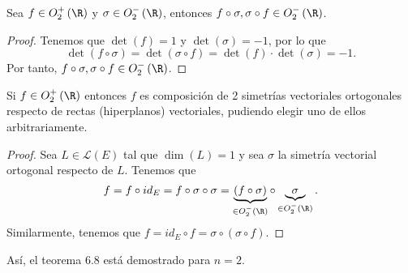\begin{flema}[]
\normalfont Sea $\displaystyle f \in O^{+}_{2}\left(\R\right) $ y $\displaystyle \sigma \in O^{-}_{2}\left(\R\right) $, entonces $\displaystyle f\circ \sigma, \sigma\circ f \in O^{-}_{2}\left(\R\right) $.
\end{flema}
\begin{proof}
Tenemos que $\displaystyle \det\left(f\right) = 1 $ y $\displaystyle \det\left(\sigma \right) = -1$, por lo que
\[ \det\left(f \circ \sigma \right) = \det\left(\sigma \circ f\right) = \det\left(f\right) \cdot \det\left(\sigma \right) = -1 .\]
Por tanto, $\displaystyle f \circ \sigma, \sigma \circ f \in O^{-}_{2}\left(\R\right) $.
\end{proof}
\begin{fcolorary}[]
\normalfont Si $\displaystyle f \in O^{+}_{2}\left(\R\right) $ entonces $\displaystyle f $ es composición de 2 simetrías vectoriales ortogonales respecto de rectas (hiperplanos) vectoriales, pudiendo elegir uno de ellos arbitrariamente.
\end{fcolorary}
\begin{proof}
Sea $\displaystyle L \in \mathcal{L}\left(E\right) $ tal que $\displaystyle \dim\left(L\right) = 1 $ y sea $\displaystyle \sigma  $ la simetría vectorial ortogonal respecto de $\displaystyle L $. Tenemos que
\[ f = f\circ id _{E} = f \circ \sigma \circ \sigma =  \underbrace{\left(f \circ \sigma \right)}_{ \in O^{-}_{2}\left(\R\right)}\circ \underbrace{\sigma}_{\in O^{-}_{2}\left(\R\right)}.\]
Similarmente, tenemos que $\displaystyle f = id _{E} \circ f = \sigma \circ \left(\sigma \circ f\right) $.
\end{proof}
\begin{observation}
\normalfont Así, el teorema 6.8 está demostrado para $\displaystyle n = 2 $.
\end{observation}
